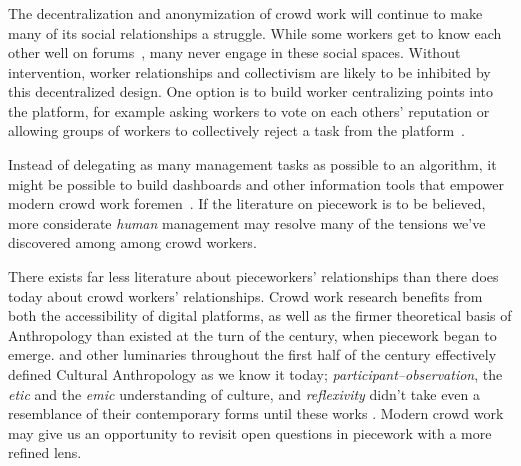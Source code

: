 \documentclass[trackingWork]{subfiles}
\begin{document}
\subsubsection{\implication}


The decentralization and anonymization of crowd work will continue to make many of its social relationships a struggle.
While some workers get to know each other well on forums~\cite{martin2014being,crowdcollab}, many never engage in these social spaces.
Without intervention, worker relationships and collectivism are likely to be inhibited by this decentralized design.
One option is to build worker centralizing points into the platform, for example asking workers to vote on each others' reputation or allowing groups of workers to collectively reject a task from the platform~\cite{crowdguilds}.

Instead of delegating as many management tasks as possible to an algorithm, it might be possible to build dashboards and other information tools that empower modern crowd work foremen~\cite{kulkarni2012mobileworks}.
If the literature on piecework is to be believed,
more considerate \textit{human} management may resolve
many of the tensions we've discovered among among crowd workers.

There exists far less literature about pieceworkers' relationships than there does today about crowd workers' relationships.
Crowd work research benefits from both the accessibility of digital platforms, as well as the firmer theoretical basis of Anthropology than
existed at the turn of the  century, when piecework began to emerge.
\citeauthor{malinowski2002argonauts,boas1940race,mead1973coming} and
other luminaries throughout the first half of the  century
effectively defined Cultural Anthropology as we know it today;
\textit{participant--observation},
the \textit{etic} and the \textit{emic} understanding of culture, and
\textit{reflexivity}
didn't take even a resemblance of their contemporary forms until these works
\cite{malinowski2002argonauts,boas1940race,mead1973coming}.
Modern crowd work may give us an opportunity to revisit open questions in piecework with a more refined lens.
\end{document}
